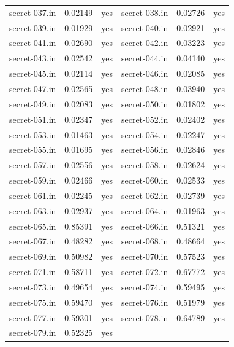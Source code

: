 {\begin{tabular}[h]{c|c|c|c|c|c}
     secret-037.in & 0.02149 & yes & secret-038.in & 0.02726 & yes \\
     secret-039.in & 0.01929 & yes & secret-040.in & 0.02921 & yes \\
     secret-041.in & 0.02690 & yes & secret-042.in & 0.03223 & yes \\
     secret-043.in & 0.02542 & yes & secret-044.in & 0.04140 & yes \\
     secret-045.in & 0.02114 & yes & secret-046.in & 0.02085 & yes \\
     secret-047.in & 0.02565 & yes & secret-048.in & 0.03940 & yes \\
     secret-049.in & 0.02083 & yes & secret-050.in & 0.01802 & yes \\
     secret-051.in & 0.02347 & yes & secret-052.in & 0.02402 & yes \\
     secret-053.in & 0.01463 & yes & secret-054.in & 0.02247 & yes \\
     secret-055.in & 0.01695 & yes & secret-056.in & 0.02846 & yes \\
     secret-057.in & 0.02556 & yes & secret-058.in & 0.02624 & yes \\
     secret-059.in & 0.02466 & yes & secret-060.in & 0.02533 & yes \\
     secret-061.in & 0.02245 & yes & secret-062.in & 0.02739 & yes \\
     secret-063.in & 0.02937 & yes & secret-064.in & 0.01963 & yes \\
     secret-065.in & 0.85391 & yes & secret-066.in & 0.51321 & yes \\
     secret-067.in & 0.48282 & yes & secret-068.in & 0.48664 & yes \\
     secret-069.in & 0.50982 & yes & secret-070.in & 0.57523 & yes \\
     secret-071.in & 0.58711 & yes & secret-072.in & 0.67772 & yes \\
     secret-073.in & 0.49654 & yes & secret-074.in & 0.59495 & yes \\
     secret-075.in & 0.59470 & yes & secret-076.in & 0.51979 & yes \\
     secret-077.in & 0.59301 & yes & secret-078.in & 0.64789 & yes \\
     secret-079.in & 0.52325 & yes \\
\end{tabular}
\clearpage%
}
%
